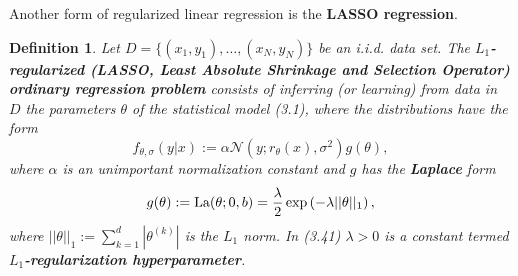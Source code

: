 \documentclass{report}
\newtheorem{definition}{Definition}[chapter]
\begin{document}
Another form of regularized linear regression is the \textbf{LASSO regression}.

\begin{definition}
Let $D = \{(x_1,y_1),\dots,(x_N,y_N)\}$ be an i.i.d. data set. The \textbf{$L_1$-regularized (LASSO, Least Absolute Shrinkage and Selection Operator) ordinary regression problem} consists of inferring (or learning) from data in $D$ the parameters $\theta$ of the statistical model (3.1), where the distributions have the form
\begin{equation}
f_{\theta,\sigma}(y|x) := \alpha\mathcal{N}(y;r_\theta(x),\sigma^2)g(\theta),
\end{equation}
where $\alpha$ is an unimportant normalization constant and $g$ has the \textbf{Laplace} form
\begin{equation}
g(\theta) := \textup{La}(\theta;0,b) = \frac{\lambda}{2}\exp\left(-\lambda||\theta||_1\right),
\end{equation}
where $||\theta||_1 := \sum_{k=1}^d |\theta^{(k)}|$ is the $L_1$ norm. In (3.41) $\lambda > 0$ is a constant termed \textbf{$L_1$-regularization hyperparameter}.
\end{definition}
\end{document}

